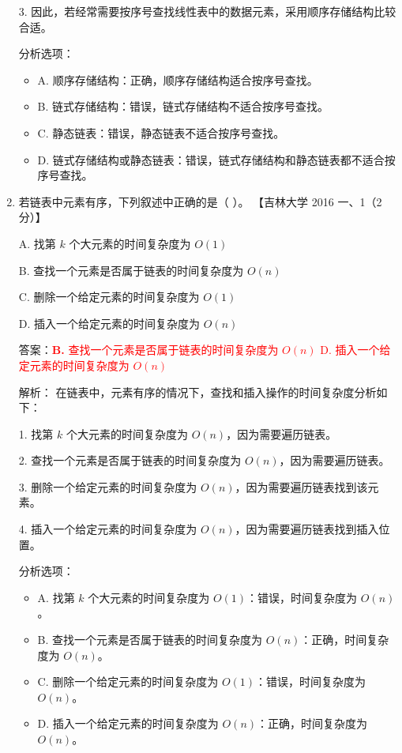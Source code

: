 \documentclass[lang=cn,newtx,10pt,scheme=chinese]{../../../elegantbook}
\begin{document}
\begin{enumerate}
        3. 因此，若经常需要按序号查找线性表中的数据元素，采用顺序存储结构比较合适。

        分析选项：
        \begin{itemize}
            \item A. 顺序存储结构：正确，顺序存储结构适合按序号查找。
            \item B. 链式存储结构：错误，链式存储结构不适合按序号查找。
            \item C. 静态链表：错误，静态链表不适合按序号查找。
            \item D. 链式存储结构或静态链表：错误，链式存储结构和静态链表都不适合按序号查找。
        \end{itemize}
    
        \item 若链表中元素有序，下列叙述中正确的是（ ）。  
        【吉林大学 2016 一、1（2 分）】  
    
        A. 找第 $k$ 个大元素的时间复杂度为 $O(1)$  
    
        B. 查找一个元素是否属于链表的时间复杂度为 $O(n)$  
    
        C. 删除一个给定元素的时间复杂度为 $O(1)$  
    
        D. 插入一个给定元素的时间复杂度为 $O(n)$ 

        答案：\textcolor{red}{\textbf{B.} 查找一个元素是否属于链表的时间复杂度为 $O(n)$ \quad D. 插入一个给定元素的时间复杂度为 $O(n)$}

        解析：
        在链表中，元素有序的情况下，查找和插入操作的时间复杂度分析如下：

        1. 找第 $k$ 个大元素的时间复杂度为 $O(n)$，因为需要遍历链表。

        2. 查找一个元素是否属于链表的时间复杂度为 $O(n)$，因为需要遍历链表。

        3. 删除一个给定元素的时间复杂度为 $O(n)$，因为需要遍历链表找到该元素。

        4. 插入一个给定元素的时间复杂度为 $O(n)$，因为需要遍历链表找到插入位置。

        分析选项：
        \begin{itemize}
            \item A. 找第 $k$ 个大元素的时间复杂度为 $O(1)$：错误，时间复杂度为 $O(n)$。
            \item B. 查找一个元素是否属于链表的时间复杂度为 $O(n)$：正确，时间复杂度为 $O(n)$。
            \item C. 删除一个给定元素的时间复杂度为 $O(1)$：错误，时间复杂度为 $O(n)$。
            \item D. 插入一个给定元素的时间复杂度为 $O(n)$：正确，时间复杂度为 $O(n)$。
        \end{itemize}
        
       
    \end{enumerate}
\end{document}

